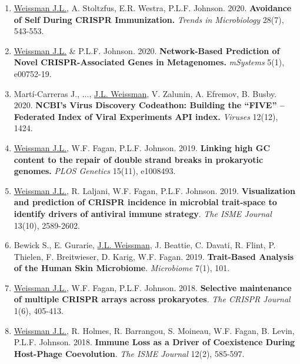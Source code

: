 \documentclass[]{res}
\begin{document}
\begin{resume}
\begin{enumerate}[leftmargin=*]
\item \underline{Weissman J.L.}, A. Stoltzfus, E.R. Westra, P.L.F. Johnson. 2020. {\bf Avoidance of Self During CRISPR Immunization.} \emph{Trends in Microbiology} 28(7), 543-553.

\item \underline{Weissman J.L.} \& P.L.F. Johnson. 2020. {\bf Network-Based Prediction of Novel CRISPR-Associated Genes in Metagenomes.} \emph{mSystems} 5(1), e00752-19.

\item Mart\'{i}-Carreras J., ..., \underline{J.L. Weissman}, V. Zalunin, A. Efremov, B. Busby. 2020. {\bf NCBI’s Virus Discovery Codeathon: Building the “FIVE” -- Federated Index of Viral Experiments API index.} \emph{Viruses} 12(12), 1424.
 
 \item \underline{Weissman J.L.}, W.F. Fagan, P.L.F. Johnson. 2019. {\bf Linking high GC content to the repair of double strand breaks in prokaryotic genomes.} \emph{PLOS Genetics} 15(11), e1008493.\\ %
 
 \item \underline{Weissman J.L.}, R. Laljani, W.F. Fagan, P.L.F. Johnson. 2019. {\bf Visualization and prediction of CRISPR incidence in microbial trait-space to identify drivers of antiviral immune strategy}. \emph{The ISME Journal} 13(10), 2589-2602. %
 
 \item Bewick S., E. Gurarie, \underline{J.L. Weissman}, J. Beattie, C. Davati, R. Flint, P. Thielen, F. Breitwieser, D. Karig, W.F. Fagan. 2019. {\bf Trait-Based Analysis of the Human Skin Microbiome}. \emph{Microbiome} 7(1), 101.  %

 \item \underline{Weissman J.L.}, W.F. Fagan, P.L.F. Johnson. 2018. {\bf Selective maintenance of multiple CRISPR arrays across prokaryotes}. \emph{The CRISPR Journal} 1(6), 405-413. %
 
\item \underline{Weissman J.L.}, R. Holmes, R. Barrangou, S. Moineau, W.F. Fagan, B. Levin, P.L.F. Johnson. 2018. {\bf Immune Loss as a Driver of Coexistence During Host-Phage Coevolution}. \emph{The ISME Journal} 12(2), 585-597. %


\end{enumerate}
\end{resume}
\end{document}
